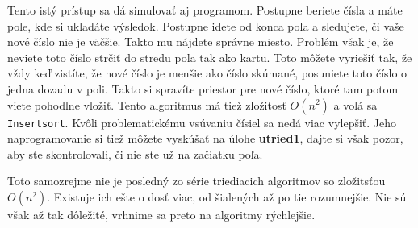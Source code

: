 Tento istý prístup sa dá simulovať aj programom. Postupne beriete čísla a máte pole, kde si ukladáte
výsledok. Postupne idete od konca poľa a sledujete, či vaše nové číslo nie je väčšie. Takto mu
nájdete správne miesto. Problém však je, že neviete toto číslo strčiť do stredu poľa tak ako kartu.
Toto môžete vyriešiť tak, že vždy keď zistíte, že nové číslo je menšie ako číslo skúmané, posuniete
toto číslo o jedna dozadu v poli. Takto si spravíte priestor pre nové číslo, ktoré tam potom viete
pohodlne vložiť. Tento algoritmus má tiež zložitosť $O(n^2)$ a volá sa \texttt{Insertsort}. Kvôli 
problematickému vsúvaniu čísiel sa nedá viac vylepšiť. Jeho naprogramovanie si tiež môžete vyskúšať
na úlohe \textbf{utried1}, dajte si však pozor, aby ste skontrolovali, či nie ste už na začiatku poľa.

Toto samozrejme nie je posledný zo série triediacich algoritmov so zložitsťou $O(n^2)$. Existuje ich
ešte o dosť viac, od šialených až po tie rozumnejšie. Nie sú však až tak dôležité, vrhnime sa preto
na algoritmy rýchlejšie.



